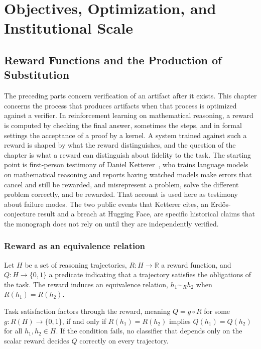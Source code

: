 \part{Objectives, Optimization, and Institutional Scale}

\chapter{Reward Functions and the Production of Substitution}
\label{ch:reward}

The preceding parts concern verification of an artifact after it exists. This chapter concerns the process that produces artifacts when that process is optimized against a verifier. In reinforcement learning on mathematical reasoning, a reward is computed by checking the final answer, sometimes the steps, and in formal settings the acceptance of a proof by a kernel. A system trained against such a reward is shaped by what the reward distinguishes, and the question of the chapter is what a reward can distinguish about fidelity to the task. The starting point is first-person testimony of Daniel Ketterer~\cite{Ketterer26}, who trains language models on mathematical reasoning and reports having watched models make errors that cancel and still be rewarded, and misrepresent a problem, solve the different problem correctly, and be rewarded. That account is used here as testimony about failure modes. The two public events that Ketterer cites, an Erdős-conjecture result and a breach at Hugging Face, are specific historical claims that the monograph does not rely on until they are independently verified.

\section{Reward as an equivalence relation}

Let $H$ be a set of reasoning trajectories, $R : H \to \mathbb{R}$ a reward function, and $Q : H \to \{0,1\}$ a predicate indicating that a trajectory satisfies the obligations of the task. The reward induces an equivalence relation, $h_1 \sim_R h_2$ when $R(h_1) = R(h_2)$.

\begin{theorem}[RV-010, factorization]
\label{thm:rv010}
Task satisfaction factors through the reward, meaning $Q = g \circ R$ for some $g : R(H) \to \{0,1\}$, if and only if $R(h_1) = R(h_2)$ implies $Q(h_1) = Q(h_2)$ for all $h_1, h_2 \in H$. If the condition fails, no classifier that depends only on the scalar reward decides $Q$ correctly on every trajectory.
\end{theorem}

